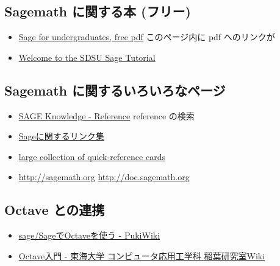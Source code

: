 \documentclass[dvipdfmx,11pt]{jarticle}
\begin{document}
\subsection{Sagemath に関する本 (フリー)}
\label{sec:org3458201}

\begin{itemize}
\item \href{http://www.gregorybard.com/Sage.html}{Sage for undergraduates, free pdf}   このページ内に pdf へのリンクが

\item \href{http://mosullivan.sdsu.edu/Teaching/sdsu-sage-tutorial/index.html}{Welcome to the SDSU Sage Tutorial}
\end{itemize}

\subsection{Sagemath に関するいろいろなページ}
\label{sec:org7f7a160}

\begin{itemize}
\item \href{http://sk.sagepub.com/reference}{SAGE Knowledge - Reference} reference の検索

\item \href{https://qiita.com/HirofumiYashima/items/6bb5770961a3b7d33118}{Sageに関するリンク集}

\item \href{http://wiki.sagemath.org/quickref}{large collection of quick-reference cards}

\item \url{http://sagemath.org} \url{http://doc.sagemath.org}
\end{itemize}


\subsection{Octave との連携}
\label{sec:org3942a67}

\begin{itemize}
\item \href{http://www.pwv.co.jp/\%7Etake/TakeWiki/index.php?sage\%2FSage\%E3\%81\%A7Octave\%E3\%82\%92\%E4\%BD\%BF\%E3\%81\%86}{sage/SageでOctaveを使う - PukiWiki}

\item \href{http://www.inaba-lab.org/wiki/index.php/Octave\%E5\%85\%A5\%E9\%96\%80}{Octave入門 - 東海大学 コンピュータ応用工学科 稲葉研究室Wiki}
\end{itemize}
\end{document}

